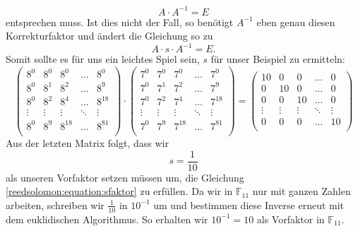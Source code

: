 \[
A \cdot A^{-1} = E
\]
entsprechen muss.
Ist dies nicht der Fall, so benötigt $A^{-1}$ eben genau diesen Korrekturfaktor und ändert die Gleichung so zu
\begin{equation}
	A \cdot s \cdot A^{-1} = E.
	\label{reedsolomon:equation:sfaktor}
\end{equation}
Somit sollte es für uns ein leichtes Spiel sein, $s$ für unser Beispiel zu ermitteln:
\[
\begin{pmatrix}
	8^0 & 8^0 & 8^0 & \dots & 8^0 \\
	8^0 & 8^1 & 8^2 & \dots & 8^9 \\
	8^0 & 8^2 & 8^4 & \dots & 8^{18} \\
	\vdots & \vdots & \vdots & \ddots & \vdots \\
	8^0 & 8^9 & 8^{18} & \dots & 8^{81} \\
\end{pmatrix}
\cdot
\begin{pmatrix}
	7^0 & 7^0 & 7^0 & \dots & 7^0 \\
	7^0 & 7^{1} & 7^{2} & \dots & 7^{9} \\
	7^0 & 7^{2} & 7^{4} & \dots & 7^{18} \\
	\vdots & \vdots & \vdots & \ddots & \vdots \\
	7^0 & 7^{9} & 7^{18} & \dots & 7^{81} \\
\end{pmatrix}
=
\begin{pmatrix}
	10 & 0 & 0 & \dots & 0 \\
	0 & 10 & 0 & \dots & 0 \\
	0 & 0 & 10 & \dots & 0 \\
	\vdots & \vdots & \vdots  & \ddots & \vdots \\
	0 & 0 & 0 & \dots & 10 \\
\end{pmatrix}
\]
Aus der letzten Matrix folgt, dass wir
\[
s = \dfrac{1}{10}
\]
als unseren Vorfaktor setzen müssen um, die Gleichung \ref{reedsolomon:equation:sfaktor} zu erfüllen. Da wir in $\mathbb{F}_{11}$ nur mit ganzen Zahlen arbeiten, schreiben wir $\frac{1}{10}$ in $10^{-1}$ um und bestimmen diese Inverse erneut mit dem euklidischen Algorithmus. So erhalten wir $10^{-1} = 10$ als Vorfaktor in $\mathbb{F}_{11}$.
%
%
